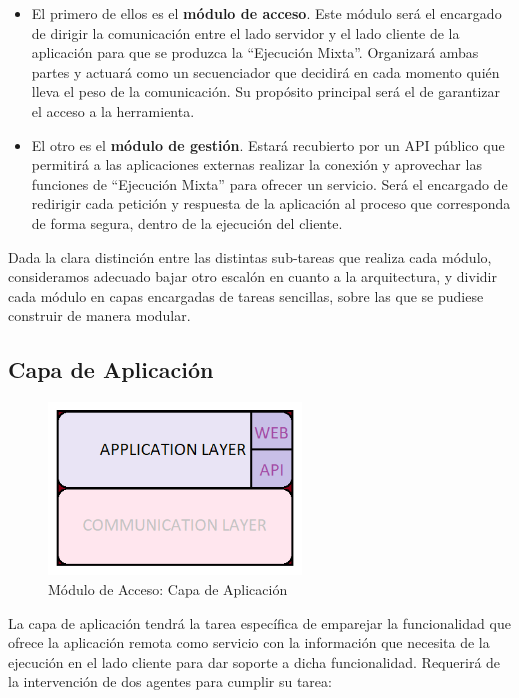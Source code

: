 \begin{itemize}
    \item [\textbullet] El primero de ellos es el \textbf{módulo de acceso}. Este módulo será el encargado de dirigir la comunicación entre el lado servidor y el lado cliente de la aplicación para que se produzca la ``Ejecución Mixta''. Organizará ambas partes y actuará como un secuenciador que decidirá en cada momento quién lleva el peso de la comunicación. Su propósito principal será el de garantizar el acceso a la herramienta.
    \item [\textbullet] El otro es el \textbf{módulo de gestión}. Estará recubierto por un API público que permitirá a las aplicaciones externas realizar la conexión y aprovechar las funciones de ``Ejecución Mixta'' para ofrecer un servicio. Será el encargado de redirigir cada petición y respuesta de la aplicación al proceso que corresponda de forma segura, dentro de la ejecución del cliente.
\end{itemize}

Dada la clara distinción entre las distintas sub-tareas que realiza cada módulo, consideramos adecuado bajar otro escalón en cuanto a la arquitectura, y dividir cada módulo en capas encargadas de tareas sencillas, sobre las que se pudiese construir de manera modular. 

\subsection{Capa de Aplicación}

\begin{figure}[!hbtp]  \centering\noindent
    \includegraphics[width=0.6\textwidth]{figures/layer4.png}
    \caption{Módulo de Acceso: Capa de Aplicación}
    \label{layer4}
\end{figure}

La capa de aplicación tendrá la tarea específica de emparejar la funcionalidad que ofrece la aplicación remota como servicio con la información que necesita de la ejecución en el lado cliente para dar soporte a dicha funcionalidad. Requerirá de la intervención de dos agentes para cumplir su tarea:

